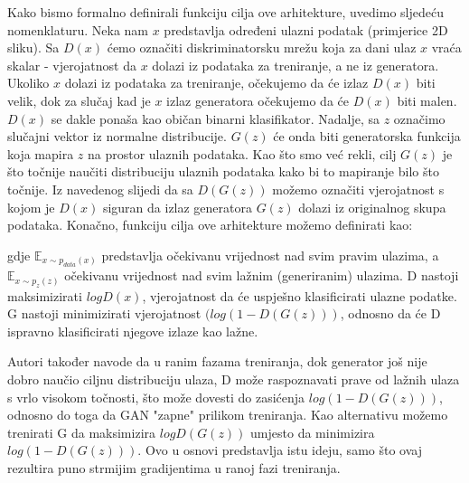 Kako bismo formalno definirali funkciju cilja ove arhitekture, uvedimo sljedeću nomenklaturu. Neka nam $x$ predstavlja određeni ulazni podatak (primjerice 2D sliku). Sa $D(x)$ ćemo označiti diskriminatorsku mrežu koja za dani ulaz $x$ vraća skalar - vjerojatnost da $x$ dolazi iz podataka za treniranje, a ne iz generatora. Ukoliko $x$ dolazi iz podataka za treniranje, očekujemo da će izlaz $D(x)$ biti velik, dok za slučaj kad je $x$ izlaz generatora očekujemo da će $D(x)$ biti malen. $D(x)$ se dakle ponaša kao običan binarni klasifikator. Nadalje, sa $z$ označimo slučajni vektor iz normalne distribucije. $G(z)$ će onda biti generatorska funkcija koja mapira $z$ na prostor ulaznih podataka. Kao što smo već rekli, cilj $G(z)$ je što točnije naučiti distribuciju ulaznih podataka kako bi to mapiranje bilo što točnije. Iz navedenog slijedi da sa $D(G(z))$ možemo označiti vjerojatnost s kojom je  $D(x)$ siguran da izlaz generatora $G(z)$ dolazi iz originalnog skupa podataka. Konačno, funkciju cilja ove arhitekture možemo definirati kao: 


\begin{myequation}%
\end{myequation}

\noindent gdje $\mathbb{E}_{x \sim p_{data}(x) }$ predstavlja očekivanu vrijednost nad svim pravim ulazima, a $\mathbb{E}_{x \sim p_{z}(z)}$ očekivanu vrijednost nad svim lažnim (generiranim) ulazima. D nastoji maksimizirati $logD(x)$, vjerojatnost da će uspješno klasificirati ulazne podatke. G nastoji minimizirati vjerojatnost $(log(1-D(G(z)))$, odnosno da će D ispravno klasificirati njegove izlaze kao lažne.

Autori također navode da u ranim fazama treniranja, dok generator još nije dobro naučio ciljnu distribuciju ulaza, D može raspoznavati prave od lažnih ulaza s vrlo visokom točnosti, što može dovesti do zasićenja $log(1 − D(G(z)))$, odnosno do toga da GAN "zapne" prilikom treniranja. Kao alternativu možemo trenirati G da maksimizira $log D(G(z))$ umjesto da minimizira $log(1 − D(G(z)))$. Ovo u osnovi predstavlja istu ideju, samo što ovaj rezultira puno strmijim gradijentima u ranoj fazi treniranja.\\


